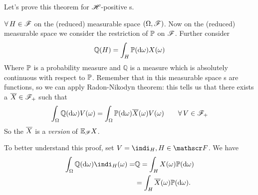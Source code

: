 \documentclass{report}
\begin{document}
Let's prove this theorem for $\mathscr{H}$-positive \rv s.
\begin{fancyproof}
	$\forall\, H\in\mathscr{F}$ on the (reduced) measurable space $(\Omega,\mathscr{F})$. Now on the (reduced) measurable space we consider the restriction of $\mathbb{P}$ on $\mathscr{F}$. Further consider
	\begin{equation*}
		\mathbb{Q}(H)=\int_H\mathbb{P}(\mathop{}\!\mathrm{d}\omega)X(\omega)
	\end{equation*}
	Where $\mathbb{P}$ is a probability measure and $\mathbb{Q}$ is a measure which is absolutely continuous with respect to $\mathbb{P}$. Remember that in this measurable space \rv s are functions, so we can apply Radon-Nikodyn theorem: this tells us that there exists a \rv{} $\overline{X}\in\mathscr{F}_+$ such that
	\begin{equation*}
		\int_\Omega \mathbb{Q}(\mathop{}\!\mathrm{d}\omega)V(\omega)=\int_\Omega\mathbb{P}(\mathop{}\!\mathrm{d}\omega)\overline{X}(\omega)V(\omega)\qquad\forall\, V\in\mathscr{F}_{+}
	\end{equation*}
	So the \rv{} $\overline{X}$ is a \textit{version} of $\mathbb{E}_{\mathscr{F}} X$.
\end{fancyproof}
To better understand this proof, set $V=\indi_H,H\in\F$. We have
\begin{align*}
	\int_{\Omega}\mathbb{Q}(\dw)\indi_H(\omega)=&\mathbb{Q}=\int_HX(\omega)\pr(\dw)\\
	&=\int_H\xbar(\omega)\pr(\dw).
\end{align*}
\end{document}

